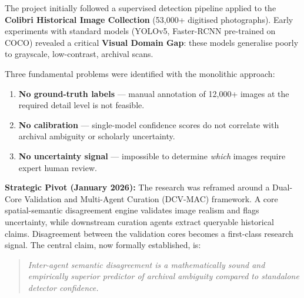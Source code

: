 \documentclass[11pt,a4paper]{article}
\theoremstyle{plain}
\begin{document}
The project initially followed a supervised detection pipeline applied to the \textbf{Colibri Historical Image Collection} (53{,}000+ digitised photographs). Early experiments with standard models (YOLOv5, Faster-RCNN pre-trained on COCO) revealed a critical \textbf{Visual Domain Gap}: these models generalise poorly to grayscale, low-contrast, archival scans.

Three fundamental problems were identified with the monolithic approach:
\begin{enumerate}[leftmargin=2em]
  \item \textbf{No ground-truth labels} — manual annotation of 12{,}000+ images at the required detail level is not feasible.
  \item \textbf{No calibration} — single-model confidence scores do not correlate with archival ambiguity or scholarly uncertainty.
  \item \textbf{No uncertainty signal} — impossible to determine \textit{which} images require expert human review.
\end{enumerate}

\textbf{Strategic Pivot (January 2026):} The research was reframed around a Dual-Core Validation and Multi-Agent Curation (DCV-MAC) framework. A core spatial-semantic disagreement engine validates image realism and flags uncertainty, while downstream curation agents extract queryable historical claims. Disagreement between the validation cores becomes a first-class research signal. The central claim, now formally established, is:

\begin{quote}
\textit{Inter-agent semantic disagreement is a mathematically sound and empirically superior predictor of archival ambiguity compared to standalone detector confidence.}
\end{quote}
\end{document}
